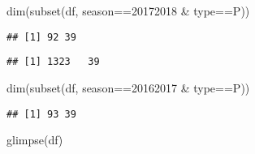 \documentclass[
]{article}
\newenvironment{Shaded}{\begin{snugshade}}{\end{snugshade}}
\newcommand{\DecValTok}[1]{\textcolor[rgb]{0.00,0.00,0.81}{#1}}
\newcommand{\FunctionTok}[1]{\textcolor[rgb]{0.00,0.00,0.00}{#1}}
\newcommand{\NormalTok}[1]{#1}
\newcommand{\SpecialCharTok}[1]{\textcolor[rgb]{0.00,0.00,0.00}{#1}}
\newcommand{\StringTok}[1]{\textcolor[rgb]{0.31,0.60,0.02}{#1}}
\begin{document}
\begin{Shaded}
\begin{Highlighting}[]
\FunctionTok{dim}\NormalTok{(}\FunctionTok{subset}\NormalTok{(df, season}\SpecialCharTok{==}\DecValTok{20172018} \SpecialCharTok{\&}\NormalTok{ type}\SpecialCharTok{==}\StringTok{\textquotesingle{}P\textquotesingle{}}\NormalTok{))}
\end{Highlighting}
\end{Shaded}

\begin{verbatim}
## [1] 92 39
\end{verbatim}

\begin{Shaded}
\end{Shaded}

\begin{verbatim}
## [1] 1323   39
\end{verbatim}

\begin{Shaded}
\begin{Highlighting}[]
\FunctionTok{dim}\NormalTok{(}\FunctionTok{subset}\NormalTok{(df, season}\SpecialCharTok{==}\DecValTok{20162017} \SpecialCharTok{\&}\NormalTok{ type}\SpecialCharTok{==}\StringTok{\textquotesingle{}P\textquotesingle{}}\NormalTok{))}
\end{Highlighting}
\end{Shaded}

\begin{verbatim}
## [1] 93 39
\end{verbatim}

\begin{Shaded}
\begin{Highlighting}[]
\FunctionTok{glimpse}\NormalTok{(df)}
\end{Highlighting}
\end{Shaded}
\end{document}
